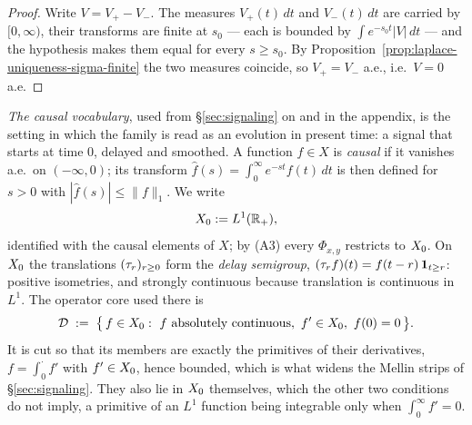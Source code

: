 \begin{proof}
Write $V = V_+ - V_-$. The measures $V_+(t)\,dt$ and $V_-(t)\,dt$ are carried by
$[0,\infty)$, their transforms are finite at $s_0$ --- each is bounded by
$\int e^{-s_0 t}|V|\,dt$ --- and the hypothesis makes them equal for every $s \ge s_0$. By
Proposition~\ref{prop:laplace-uniqueness-sigma-finite} the two measures coincide, so
$V_+ = V_-$ a.e., i.e.\ $V = 0$ a.e.
\end{proof}

\emph{The causal vocabulary}, used from \S\ref{sec:signaling} on and in the appendix, is
the setting in which the family is read as an evolution in present time: a signal that
starts at time $0$, delayed and smoothed. A function $f \in X$ is \emph{causal} if it
vanishes a.e.\ on $(-\infty, 0)$; its transform
$\hat f(s) = \int_0^\infty e^{-st} f(t)\,dt$ is then defined for $s > 0$ with
$|\hat f(s)| \le \|f\|_1$. We write
\[
  X_0 := L^1(\mathbb{R}_+),
\]
identified with the causal elements of $X$; by (A3) every $\Phi_{x,y}$ restricts to $X_0$.
On $X_0$ the translations $(\tau_r)_{r \ge 0}$ form the \emph{delay semigroup},
$(\tau_r f)(t) = f(t - r)\,\mathbf{1}_{t \ge r}$: positive isometries, and strongly
continuous because translation is continuous in $L^1$. The operator core used there is
\[
  \mathcal{D} \;:=\; \bigl\{\, f \in X_0 :\ f \text{ absolutely continuous},\ f' \in X_0,\
  f(0) = 0 \,\bigr\}.
\]
It is cut so that its members are exactly the primitives of their derivatives,
$f = \int_0^{\cdot} f'$ with $f' \in X_0$, hence bounded, which is what widens the Mellin
strips of \S\ref{sec:signaling}. They also lie in $X_0$ themselves, which the other two
conditions do not imply, a primitive of an $L^1$ function being integrable only when
$\int_0^\infty f' = 0$.

